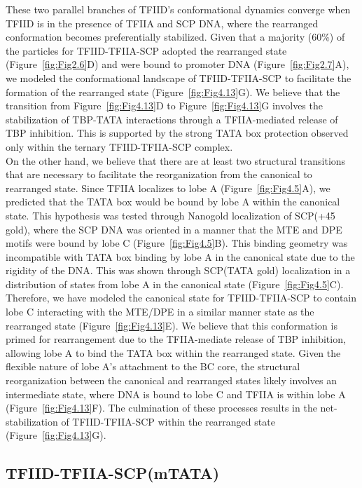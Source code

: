 \indent These two parallel branches of TFIID's conformational dynamics converge when TFIID is in the presence of TFIIA and SCP DNA, where the rearranged conformation becomes preferentially stabilized. Given that a majority (60\%) of the particles for TFIID-TFIIA-SCP adopted the rearranged state (Figure~\ref{fig:Fig2.6}D) and were bound to promoter DNA (Figure~\ref{fig:Fig2.7}A), we modeled the conformational landscape of TFIID-TFIIA-SCP to facilitate the formation of the rearranged state (Figure~\ref{fig:Fig4.13}G). We believe that the transition from Figure~\ref{fig:Fig4.13}D to Figure~\ref{fig:Fig4.13}G involves the stabilization of TBP-TATA interactions through a TFIIA-mediated release of TBP inhibition. This is supported by the strong TATA box protection observed only within the ternary TFIID-TFIIA-SCP complex. \\
\indent On the other hand, we believe that there are at least two structural transitions that are necessary to facilitate the reorganization from the canonical to rearranged state. Since TFIIA localizes to lobe A (Figure~\ref{fig:Fig4.5}A), we predicted that the TATA box would be bound by lobe A within the canonical state.  This hypothesis was tested through Nanogold localization of SCP(+45 gold), where the SCP DNA was oriented in a manner that the MTE and DPE motifs were bound by lobe C (Figure~\ref{fig:Fig4.5}B). This binding geometry was incompatible with TATA box binding by lobe A in the canonical state due to the rigidity of the DNA. This was shown through SCP(TATA gold) localization in a distribution of states  from lobe A in the canonical state (Figure~\ref{fig:Fig4.5}C). Therefore, we have modeled the canonical state for TFIID-TFIIA-SCP to contain lobe C interacting with the MTE/DPE in a similar manner state as the rearranged state (Figure~\ref{fig:Fig4.13}E). We believe that this conformation is primed for rearrangement due to the TFIIA-mediate release of TBP inhibition, allowing lobe A to bind the TATA box within the rearranged state. Given the flexible nature of lobe A's attachment to the BC core, the structural reorganization between the canonical and rearranged states likely involves an intermediate state, where DNA is bound to lobe C and TFIIA is within lobe A (Figure~\ref{fig:Fig4.13}F). The culmination of these processes results in the net-stabilization of TFIID-TFIIA-SCP within the rearranged state (Figure~\ref{fig:Fig4.13}G).\\ 

\subsection{TFIID-TFIIA-SCP(mTATA)}

